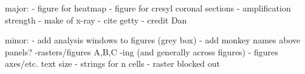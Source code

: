 major:
- figure for heatmap
- figure for cresyl coronal sections
- amplification strength
- make of x-ray
- cite getty
- credit Dan

minor:
- add analysis windows to figures (grey box)
- add monkey names above panels?
-rasters/figures A,B,C -ing (and generally across figures)
- figures axes/etc. text size
- strings for n cells
- raster blocked out
